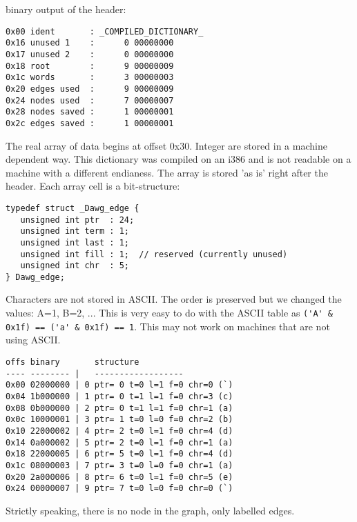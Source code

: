 \documentclass[dvips]{article}
\begin{document}
binary output of the header:

\begin{small}
\begin{verbatim}
0x00 ident       : _COMPILED_DICTIONARY_
0x16 unused 1    :      0 00000000
0x17 unused 2    :      0 00000000
0x18 root        :      9 00000009
0x1c words       :      3 00000003
0x20 edges used  :      9 00000009
0x24 nodes used  :      7 00000007
0x28 nodes saved :      1 00000001
0x2c edges saved :      1 00000001
\end{verbatim}
\end{small}

The real array of data begins at offset 0x30. Integer are stored in a
machine dependent way. This dictionary was compiled on an i386 and is
not readable on a machine with a different endianess.  The array is
stored 'as is' right after the header. Each array cell is a
bit-structure:

\begin{small}
\begin{verbatim}
typedef struct _Dawg_edge { 
   unsigned int ptr  : 24; 
   unsigned int term : 1;  
   unsigned int last : 1;  
   unsigned int fill : 1;  // reserved (currently unused)
   unsigned int chr  : 5;  
} Dawg_edge;    
\end{verbatim}
\end{small}

Characters are not stored in ASCII. The order is preserved but
we changed the values: A=1, B=2, ... This is very easy to do 
with the ASCII table as \verb;('A' & 0x1f) == ('a' & 0x1f) == 1;.
This may not work on machines that are not using ASCII.

\begin{small}
\begin{verbatim}
offs binary       structure         
---- -------- |   ------------------
0x00 02000000 | 0 ptr= 0 t=0 l=1 f=0 chr=0 (`)
0x04 1b000000 | 1 ptr= 0 t=1 l=1 f=0 chr=3 (c)
0x08 0b000000 | 2 ptr= 0 t=1 l=1 f=0 chr=1 (a)
0x0c 10000001 | 3 ptr= 1 t=0 l=0 f=0 chr=2 (b)
0x10 22000002 | 4 ptr= 2 t=0 l=1 f=0 chr=4 (d)
0x14 0a000002 | 5 ptr= 2 t=0 l=1 f=0 chr=1 (a)
0x18 22000005 | 6 ptr= 5 t=0 l=1 f=0 chr=4 (d)
0x1c 08000003 | 7 ptr= 3 t=0 l=0 f=0 chr=1 (a)
0x20 2a000006 | 8 ptr= 6 t=0 l=1 f=0 chr=5 (e)
0x24 00000007 | 9 ptr= 7 t=0 l=0 f=0 chr=0 (`)
\end{verbatim}
\end{small}

Strictly speaking, there is no node in the graph, only labelled edges. 
\end{document}
